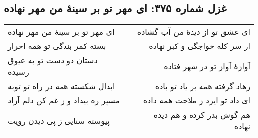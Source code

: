\begin{center}
\section*{غزل شماره ۳۷۵: ای مهر تو بر سینهٔ من مهر نهاده}
\label{sec:375}
\begin{longtable}{l p{0.5cm} r}
ای مهر تو بر سینهٔ من مهر نهاده
&&
ای عشق تو از دیدهٔ من آب گشاده
\\
بسته کمر بندگی تو همه احرار
&&
از سر کله خواجگی و کبر نهاده
\\
دستان دو دست تو به عیوق رسیده
&&
آوازهٔ آواز تو در شهر فتاده
\\
ابدال شکسته همه در راه تو توبه
&&
زهاد گرفته همه بر یاد تو باده
\\
مسپر ره بیداد و ز غم کن دلم آزاد
&&
ای داد تو ایزد ز ملاحت همه داده
\\
پیوسته سنایی ز پی دیدن رویت
&&
هم گوش بدر کرده و هم دیده نهاده
\\
\end{longtable}
\end{center}
